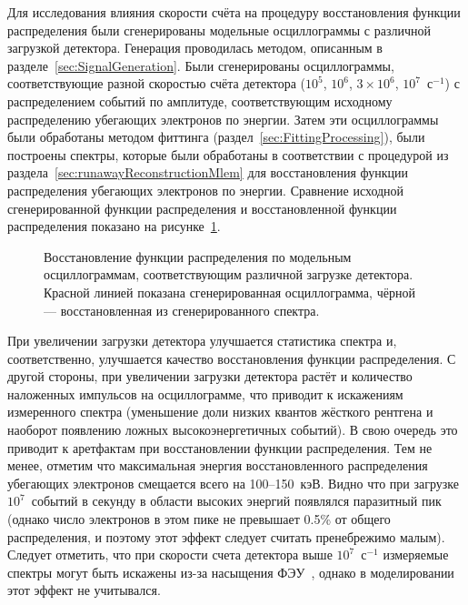 Для исследования влияния скорости счёта на процедуру восстановления функции распределения были сгенерированы модельные осциллограммы с различной загрузкой детектора. Генерация проводилась методом, описанным в разделе~\ref{sec:SignalGeneration}. Были сгенерированы осциллограммы, соответствующие разной скоростью счёта детектора ($10^5$, $10^6$, $3\times10^6$, $10^7$~с${}^{-1}$) с распределением событий по амплитуде, соответствующим исходному распределению убегающих электронов по энергии. Затем эти осциллограммы были обработаны методом фиттинга (раздел~\ref{sec:FittingProcessing}), были построены спектры, которые были обработаны в соответствии с процедурой из раздела~\ref{sec:runawayReconstructionMlem} для восстановления функции распределения убегающих электронов по энергии. Сравнение исходной сгенерированной функции распределения и восстановленной функции распределения показано на рисунке~\ref{fig:ft2TestReCountRate}.~\cite{Shevelev2016}


\begin{figure}[ht!]
  \caption{ Восстановление функции распределения по модельным осциллограммам, соответствующим различной загрузке детектора. Красной линией показана сгенерированная осциллограмма, чёрной --- восстановленная из сгенерированного спектра.~\cite{Shevelev2016} }
  \label{fig:ft2TestReCountRate}
\end{figure}

При увеличении загрузки детектора улучшается статистика спектра и, соответственно, улучшается качество восстановления функции распределения. С другой стороны, при увеличении загрузки детектора растёт и количество наложенных импульсов на осциллограмме, что приводит к искажениям измеренного спектра (уменьшение доли низких квантов жёсткого рентгена и наоборот появлению ложных высокоэнергетичных событий). В свою очередь это приводит к аретфактам при восстановлении функции распределения. Тем не менее, отметим что максимальная энергия восстановленного распределения убегающих электронов смещается всего на 100--150~кэВ. Видно что при загрузке $10^7$~событий в секунду в области высоких энергий появлялся паразитный пик (однако число электронов в этом пике не превышает 0.5\% от общего распределения, и поэтому этот эффект следует считать пренебрежимо малым). Следует отметить, что при скорости счета детектора выше $10^7$~с${}^{-1}$ измеряемые спектры могут быть искажены из-за насыщения ФЭУ~\cite{Loher20121}, однако в моделировании этот эффект не учитывался.~\cite{Shevelev2016}

